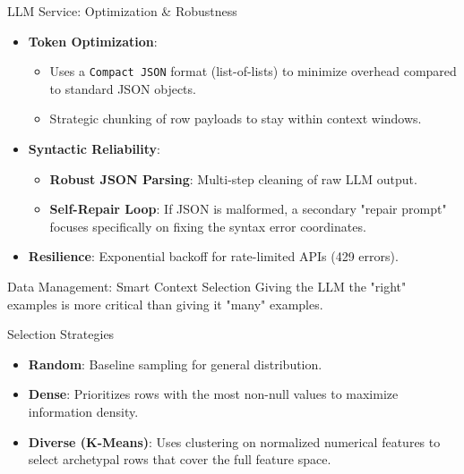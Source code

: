 \documentclass{beamer}
\begin{document}
\begin{frame}{LLM Service: Optimization \& Robustness}
    \begin{itemize}
        \item \textbf{Token Optimization}:
        \begin{itemize}
            \item Uses a \texttt{Compact JSON} format (list-of-lists) to minimize overhead compared to standard JSON objects.
            \item Strategic chunking of row payloads to stay within context windows.
        \end{itemize}
        \item \textbf{Syntactic Reliability}:
        \begin{itemize}
            \item \textbf{Robust JSON Parsing}: Multi-step cleaning of raw LLM output.
            \item \textbf{Self-Repair Loop}: If JSON is malformed, a secondary "repair prompt" focuses specifically on fixing the syntax error coordinates.
        \end{itemize}
        \item \textbf{Resilience}: Exponential backoff for rate-limited APIs (429 errors).
    \end{itemize}
\end{frame}

\begin{frame}{Data Management: Smart Context Selection}
    Giving the LLM the "right" examples is more critical than giving it "many" examples.
    \vspace{0.2cm}
    \begin{block}{Selection Strategies}
        \begin{itemize}
            \item \textbf{Random}: Baseline sampling for general distribution.
            \item \textbf{Dense}: Prioritizes rows with the most non-null values to maximize information density.
            \item \textbf{Diverse (K-Means)}: Uses clustering on normalized numerical features to select archetypal rows that cover the full feature space.
        \end{itemize}
    \end{block}
\end{frame}
\end{document}
